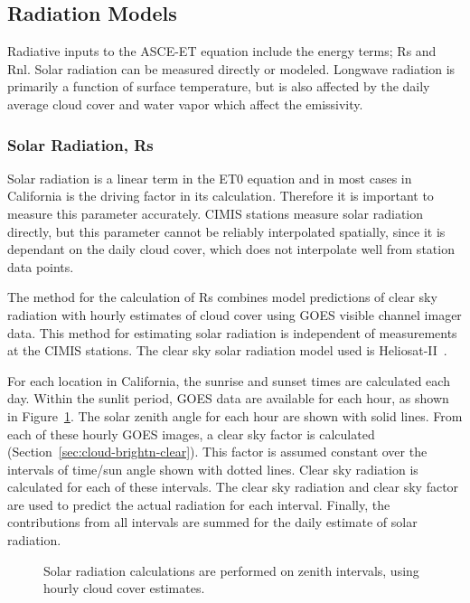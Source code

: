 \documentclass[reviewcopy]{elsart}
\begin{document}
\subsection{Radiation Models}
\label{sec:radiation}

Radiative inputs to the \ac{ASCE-ET} equation include the energy terms;
\ac{Rs} and \ac{Rnl}.  Solar radiation can be measured directly or
modeled. Longwave radiation is primarily a function of surface
temperature, but is also affected by the daily average cloud cover and
water vapor which affect the emissivity.

\subsubsection{Solar Radiation, \ac{Rs}}

Solar radiation is a linear term in the \ac{ET0} equation and in most
cases in California is the driving factor in its calculation.
Therefore it is important to measure this parameter accurately.
\ac{CIMIS} stations measure solar radiation directly, but this
parameter cannot be reliably interpolated spatially, since it is
dependant on the daily cloud cover, which does not interpolate well
from station data points.

The method for the calculation of \ac{Rs} combines model predictions
of clear sky radiation with hourly estimates of cloud cover using
\ac{GOES} visible channel imager data.  This method for estimating
solar radiation is independent of measurements at the \ac{CIMIS}
stations.  The clear sky solar radiation model used is
Heliosat-II~\citep{rigol.ea:00:on-clear,lefer.ea:02:descr-of}.

For each location in California, the sunrise and sunset times are
calculated each day.  Within the sunlit period, \ac{GOES} data are
available for each hour, as shown in Figure~\ref{fig:radiation}.  The
solar zenith angle for each hour are shown with solid lines.
From each of these hourly \ac{GOES} images, a clear sky factor is
calculated (Section~\ref{sec:cloud-brightn-clear}).  This factor is
assumed constant over the intervals of time/sun angle shown with
dotted lines.  Clear sky radiation is calculated for each of these
intervals.  The clear sky radiation and clear sky factor are used to
predict the actual radiation for each interval.  Finally, the
contributions from all intervals are summed for the daily estimate of
solar radiation.

\begin{figure}[htbp]
  \centering
  \resizebox{0.5\textwidth}{!}{}
  \caption{
%
    Solar radiation calculations are performed on zenith intervals, using hourly cloud cover estimates. 
%
  }
  \label{fig:radiation}
\end{figure}
\end{document}
